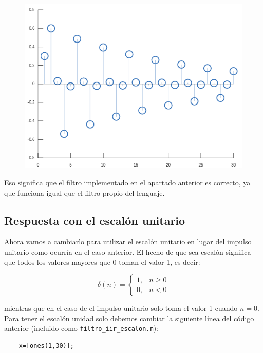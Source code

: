 \documentclass[11pt,a4paper]{article}
\begin{document}
\begin{figure}[H]
	\centering
	\includegraphics[scale=0.5]{img/stem-filter.png}
\end{figure}

Eso significa que el filtro implementado en el apartado anterior es correcto, ya que funciona igual que el filtro propio del lenguaje.

\subsection{Respuesta con el escalón unitario}

Ahora vamos a cambiarlo para utilizar el escalón unitario en lugar del impulso unitario como ocurría en el caso anterior. El hecho de que sea escalón significa que todos los valores mayores que 0 toman el valor 1, es decir:

\[\delta(n)=\begin{cases} 
      1, & n\geq 0\\
      0, & n< 0
   \end{cases}
\]

 mientras que en el caso de el impulso unitario solo toma el valor 1 cuando $n=0$.\\
 
Para tener el escalón unidad solo debemos cambiar la siguiente línea del código anterior (incluido como \texttt{filtro\_iir\_escalon.m}):

\begin{lstlisting}[frame=single]
	% Se definen los arrays con los pulsos. El escalon unitario
   	x=[ones(1,30)];
\end{lstlisting}
\end{document}
